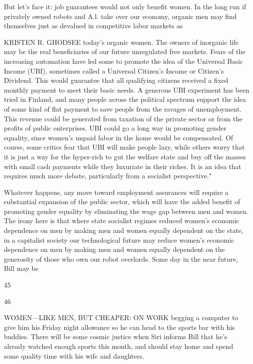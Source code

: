  \par 
But let’s face it: job guarantees would not only benefit women. In the long run if privately owned robots and A.l. take over our economy, organic men may find themselves just as devalued in competitive labor markets as
 \par 
KRISTEN R. GHODSEE today’s organic women. The owners of inorganic life may be the real beneficiaries of our future unregulated free markets. Fears of the increasing automation have led some to promote the idea of the Universal Basic Income (UBI), sometimes called a Universal Citizen’s Income or Citizen’s Dividend. This would guarantee that all qualifying citizens received a fixed monthly payment to meet their basic needs. A generous UBI experiment has been tried in Finland, and many people across the political spectrum support the idea of some kind of flat payment to save people from the ravages of unemployment. This revenue could be generated from taxation of the private sector or from the profits of public enterprises. UBI could go a long way in promoting gender equality, since women’s unpaid labor in the home would be compensated. Of course, some critics fear that UBI will make people lazy, while others worry that it is just a way for the hyper-rich to gut the welfare state and buy off the masses with small cash payments while they luxuriate in their riches. It is an idea that requires much more debate, particularly from a socialist perspective."
 \par 
Whatever happens, any move toward employment assurances will require a substantial expansion of the public sector, which will have the added benefit of promoting gender equality by eliminating the wage gap between men and women. The irony here is that where state socialist regimes reduced women’s economic dependence on men by making men and women equally dependent on the state, in a capitalist society our technological future may reduce women’s economic dependence on men by making men and women equally dependent on the generosity of those who own our robot overlords. Some day in the near future, Bill may be
 \par 
45
 \par 
46
 \par 
WOMEN—LIKE MEN, BUT CHEAPER: ON WORK begging a computer to give him his Friday night allowance so he can head to the sports bar with his buddies. There will be some cosmic justice when Siri informs Bill that he’s already watched enough sports this month, and should stay home and spend some quality time with his wife and daughters.
 \par 
